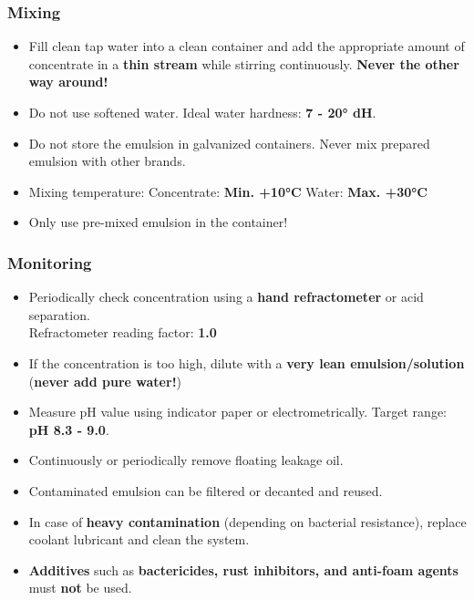 \subsubsection*{Mixing}
\begin{itemize}
    \item Fill clean tap water into a clean container and add the appropriate amount of concentrate in a \textbf{thin stream} while stirring continuously.  
          \textbf{Never the other way around!}
    \item Do not use softened water. Ideal water hardness: \textbf{7 - 20° dH}.
    \item Do not store the emulsion in galvanized containers. Never mix prepared emulsion with other brands.
    \item Mixing temperature:  
          \quad Concentrate: \textbf{Min. +10°C}  
          \quad Water: \textbf{Max. +30°C}
    \item Only use pre-mixed emulsion in the container!
\end{itemize}

\subsubsection*{Monitoring}
\begin{itemize}
    \item Periodically check concentration using a \textbf{hand refractometer} or acid separation.  
          \\Refractometer reading factor: \textbf{1.0}
    \item If the concentration is too high, dilute with a \textbf{very lean emulsion/solution}  
          (\textbf{never add pure water!})
    \item Measure pH value using indicator paper or electrometrically.  
          Target range: \textbf{pH 8.3 - 9.0}.
    \item Continuously or periodically remove floating leakage oil.
    \item Contaminated emulsion can be filtered or decanted and reused.
    \item In case of \textbf{heavy contamination} (depending on bacterial resistance), replace coolant lubricant and clean the system.
    \item \textbf{Additives} such as \textbf{bactericides, rust inhibitors, and anti-foam agents} must \textbf{not} be used.
\end{itemize}

\setcounter{section}{10}

